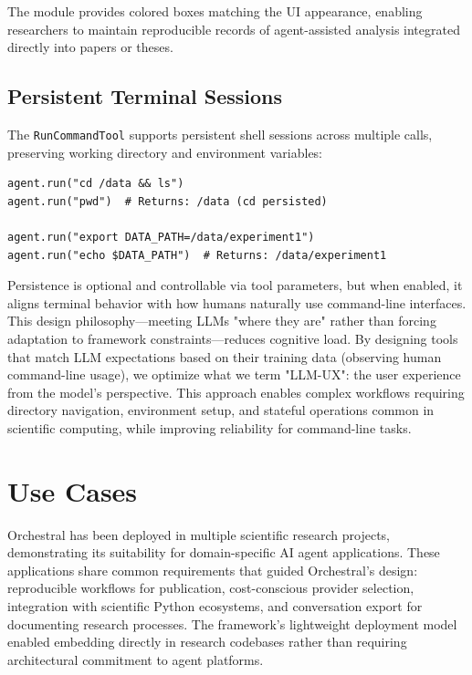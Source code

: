 \documentclass{article}
\begin{document}
The module provides colored boxes matching the UI appearance, enabling researchers to maintain reproducible records of agent-assisted analysis integrated directly into papers or theses.

\subsection{Persistent Terminal Sessions}\label{sec:persistent-sessions}

The \texttt{RunCommandTool} supports persistent shell sessions across multiple calls, preserving working directory and environment variables:

\begin{verbatim}
agent.run("cd /data && ls")
agent.run("pwd")  # Returns: /data (cd persisted)

agent.run("export DATA_PATH=/data/experiment1")
agent.run("echo $DATA_PATH")  # Returns: /data/experiment1
\end{verbatim}

Persistence is optional and controllable via tool parameters, but when enabled, it aligns terminal behavior with how humans naturally use command-line interfaces. This design philosophy—meeting LLMs "where they are" rather than forcing adaptation to framework constraints—reduces cognitive load. By designing tools that match LLM expectations based on their training data (observing human command-line usage), we optimize what we term "LLM-UX": the user experience from the model's perspective. This approach enables complex workflows requiring directory navigation, environment setup, and stateful operations common in scientific computing, while improving reliability for command-line tasks.

\section{Use Cases}

Orchestral has been deployed in multiple scientific research projects, demonstrating its suitability for domain-specific AI agent applications. These applications share common requirements that guided Orchestral's design: reproducible workflows for publication, cost-conscious provider selection, integration with scientific Python ecosystems, and conversation export for documenting research processes. The framework's lightweight deployment model enabled embedding directly in research codebases rather than requiring architectural commitment to agent platforms.
\end{document}
